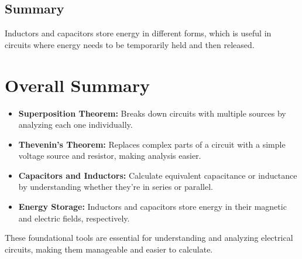 \documentclass{article}
\begin{document}
\subsection{Summary}
Inductors and capacitors store energy in different forms, which is useful in circuits where energy needs to be temporarily held and then released.

\newpage
\section{Overall Summary}
\begin{itemize}
    \item \textbf{Superposition Theorem:} Breaks down circuits with multiple sources by analyzing each one individually.
    \item \textbf{Thevenin's Theorem:} Replaces complex parts of a circuit with a simple voltage source and resistor, making analysis easier.
    \item \textbf{Capacitors and Inductors:} Calculate equivalent capacitance or inductance by understanding whether they’re in series or parallel.
    \item \textbf{Energy Storage:} Inductors and capacitors store energy in their magnetic and electric fields, respectively.
\end{itemize}
These foundational tools are essential for understanding and analyzing electrical circuits, making them manageable and easier to calculate.
\end{document}
